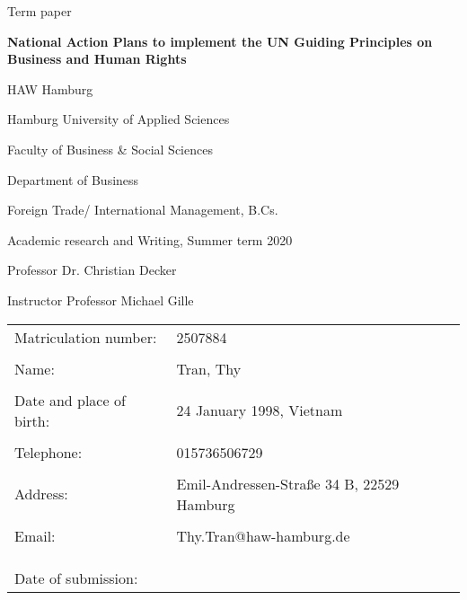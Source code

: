 \thispagestyle{empty}
\phantom{o}
\vspace{3cm}
\begin{center}
Term paper

\vspace{1em}

\textbf{\Large{National Action Plans to implement the UN Guiding Principles on
Business and Human Rights}}

\vspace{1cm}

HAW Hamburg

Hamburg University of Applied Sciences

Faculty of Business \& Social Sciences

Department of Business

\vspace{1cm}

Foreign Trade/ International Management, B.Cs.

Academic research and Writing, Summer term 2020

Professor Dr. Christian Decker

Instructor Professor Michael Gille
\end{center}

\vfill

\begin{table}[h]
\begin{tabular}{ll}
Matriculation number:    & 2507884                                                                    \\ \\[-1em]
Name:                    & Tran, Thy                                                                  \\ \\[-1em]
Date and place of birth: & 24 January 1998, Vietnam                                                   \\ \\[-1em]
Telephone:               & 015736506729                                                               \\ \\[-1em]
Address:                 & Emil-Andressen-Straße 34 B, 22529 Hamburg                                  \\ \\[-1em]
Email:                   & Thy.Tran@haw-hamburg.de                                                    \\ \\[-1em]
                         &                                                                            \\ \\[-1em]
Date of submission:      & 
\end{tabular}
\end{table}
